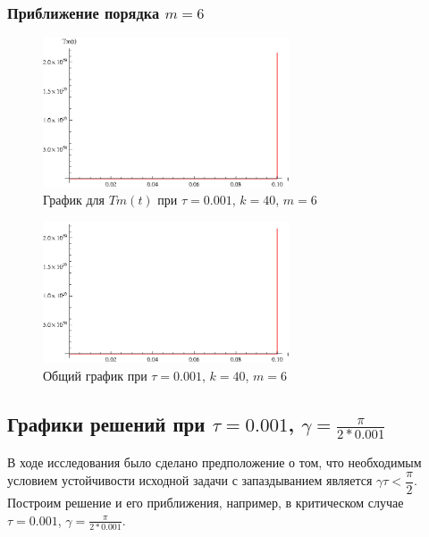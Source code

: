 \newpage

\subsubsection{Приближение порядка $m=6$}

\begin{figure}[h]
\begin{center}
\includegraphics[width=0.65\textwidth]{./3_results/4_12.eps}
\end{center}
\caption{График для $Tm(t)$ при $\tau=0.001$, $k=40$, $m=6$}
\end{figure}

\begin{figure}[h]
\begin{center}
\includegraphics[width=0.65\textwidth]{./3_results/4_13.eps}
\end{center}
\caption{Общий график при $\tau=0.001$, $k=40$, $m=6$}
\end{figure}

\newpage

\subsection{Графики решений при $\tau=0.001$, $\gamma = \frac{\pi}{2*0.001}$}

В ходе исследования было сделано предположение о том, что необходимым условием устойчивости исходной задачи с запаздыванием является $\gamma \tau < \dfrac{\pi}{2}$. Построим решение и его приближения, например, в критическом случае $\tau=0.001$, $\gamma = \frac{\pi}{2*0.001}$.

